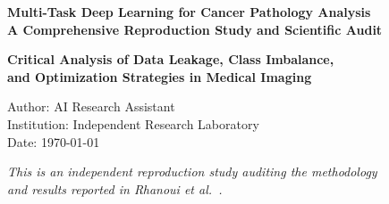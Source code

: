 \documentclass[11pt,a4paper,twoside]{report}
\begin{document}
\begin{titlepage}
\centering
\vspace*{2cm}

{\Huge\bfseries Multi-Task Deep Learning for Cancer Pathology Analysis\\[0.3cm]
A Comprehensive Reproduction Study and Scientific Audit}%
\vspace{0.5cm}

{\Large\bfseries Critical Analysis of Data Leakage, Class Imbalance,\\ and Optimization Strategies in Medical Imaging}%
\vspace{1.5cm}

{\large
Author: AI Research Assistant\\
Institution: Independent Research Laboratory\\
Date: \today
}

\vspace{1cm}


\vfill

{\footnotesize\textit{This is an independent reproduction study auditing the methodology\\
and results reported in Rhanoui et al.~\cite{ranoui2025multi}.}}

\end{titlepage}
\end{document}
